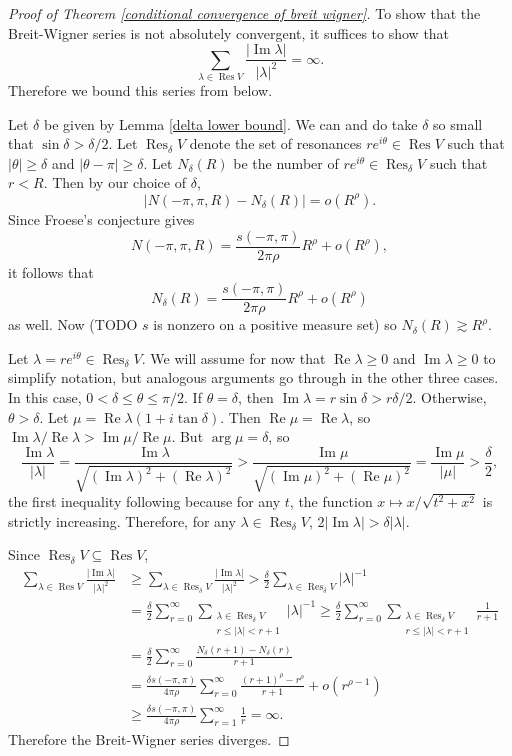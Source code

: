 \documentclass[12pt]{report}
\DeclareMathOperator{\Res}{Res}
\renewcommand{\Re}{\operatorname{Re}}
\renewcommand{\Im}{\operatorname{Im}}
\theoremstyle{definition}
\begin{document}
\begin{proof}[Proof of Theorem \ref{conditional convergence of breit wigner}]
To show that the Breit-Wigner series is not absolutely convergent, it suffices to show that
$$\sum_{\lambda \in \Res V} \frac{|\Im \lambda|}{|\lambda|^2} = \infty.$$
Therefore we bound this series from below.

Let $\delta$ be given by Lemma \ref{delta lower bound}. We can and do take $\delta$ so small that $\sin \delta > \delta/2$.
Let $\Res_\delta V$ denote the set of resonances $re^{i\theta} \in \Res V$ such that $|\theta| \geq \delta$ and $|\theta - \pi| \geq \delta$.
Let $N_\delta(R)$ be the number of $re^{i\theta} \in \Res_\delta V$ such that $r < R$. Then by our choice of $\delta$,
$$|N(-\pi, \pi, R) - N_\delta(R)| = o(R^\rho).$$
Since Froese's conjecture gives
$$N(-\pi, \pi, R) = \frac{s(-\pi, \pi)}{2\pi \rho}R^\rho + o(R^\rho),$$
it follows that
$$N_\delta(R) = \frac{s(-\pi, \pi)}{2\pi \rho}R^\rho + o(R^\rho)$$
as well. Now (TODO $s$ is nonzero on a positive measure set) so $N_\delta(R) \gtrsim R^\rho$.

Let $\lambda = re^{i\theta} \in \Res_\delta V$. We will assume for now that $\Re \lambda \geq 0$ and $\Im \lambda \geq 0$ to simplify notation, but analogous arguments go through in the other three cases. In this case, $0 < \delta \leq \theta \leq \pi/2$. If $\theta = \delta$, then $\Im \lambda = r \sin \delta > r\delta/2$.
Otherwise, $\theta > \delta$. Let $\mu = \Re \lambda(1 + i\tan\delta)$. Then $\Re \mu = \Re \lambda$, so $\Im \lambda/\Re \lambda > \Im \mu/\Re \mu$. But $\arg \mu = \delta$, so
$$\frac{\Im \lambda}{|\lambda|} = \frac{\Im \lambda}{\sqrt{(\Im \lambda)^2 + (\Re \lambda)^2}} > \frac{\Im \mu}{\sqrt{(\Im \mu)^2 + (\Re \mu)^2}} = \frac{\Im \mu}{|\mu|} > \frac{\delta}{2},$$
the first inequality following because for any $t$, the function $x \mapsto x/\sqrt{t^2 + x^2}$ is strictly increasing. Therefore, for any $\lambda \in \Res_\delta V$, $2|\Im \lambda| > \delta|\lambda|$.

Since $\Res_\delta V \subseteq \Res V$,
\begin{align*}\sum_{\lambda \in \Res V} \frac{|\Im \lambda|}{|\lambda|^2}
&\geq \sum_{\lambda \in \Res_\delta V} \frac{|\Im \lambda|}{|\lambda|^2}
> \frac{\delta}{2} \sum_{\lambda \in \Res_\delta V} |\lambda|^{-1}
\\&= \frac{\delta}{2} \sum_{r=0}^\infty \sum_{\substack{\lambda \in \Res_\delta V\\r \leq |\lambda| < r + 1}} |\lambda|^{-1}
\geq \frac{\delta}{2} \sum_{r=0}^\infty \sum_{\substack{\lambda \in \Res_\delta V\\r \leq |\lambda| < r + 1}} \frac{1}{r + 1}
\\&= \frac{\delta}{2} \sum_{r=0}^\infty \frac{N_\delta(r+1) - N_\delta(r)}{r + 1}
\\&= \frac{\delta s(-\pi, \pi)}{4\pi\rho} \sum_{r=0}^\infty \frac{(r+1)^\rho - r^\rho}{r+1} + o(r^{\rho - 1})
\\&\geq \frac{\delta s(-\pi, \pi)}{4\pi\rho} \sum_{r=1}^\infty \frac{1}{r} = \infty.
\end{align*}
Therefore the Breit-Wigner series diverges.
\end{proof}



\printbibliography



\printindex
\end{document}

